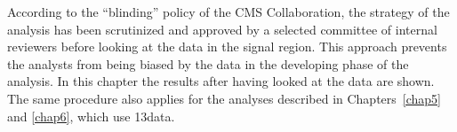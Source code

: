 According to the ``blinding'' policy of the CMS Collaboration, the strategy of the analysis has been scrutinized and approved by a selected committee of internal reviewers before looking at the data in the signal region. This approach prevents the analysts from being biased by the data in the developing phase of the analysis. In this chapter the results after having looked at the data are shown. The same procedure also applies for the analyses described in Chapters~\ref{chap5} and \ref{chap6}, which use 13\TeV data.








\clearpage


